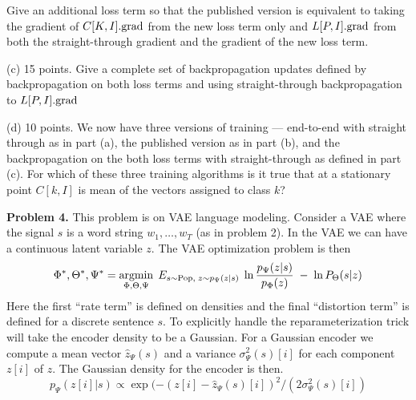 \documentclass{article}
\newcommand{\solution}[1]{}
\begin{document}
Give an additional loss term so that the published version is equivalent to taking the gradient of $C[K,I].\mathrm{grad}$ from the new loss term only
and $L[P,I].\mathrm{grad}$ from both the straight-through gradient and the gradient of the new loss term.

\solution{
  The additional loss is
  $$\frac{1}{2}\beta||L[P,I] - \hat{L}[P,I]||^2 = \sum_p \frac{1}{2}\beta||L[p,I] - C[k[p],I]||^2$$
}

(c) 15 points. Give a complete set of backpropagation updates defined by backpropagation on both loss terms and using straight-through
backpropagation to $L[P,I].\mathrm{grad}$

\solution{
\begin{eqnarray*}
  L.\grad & \pluseq & \hat{L}.\grad \\
  \mathrm{for}\;p\;\;\;C[k[p],I].\grad & \pluseq & \hat{L}[p,I].\grad \\
L.\grad & \pluseq & \beta(L - \hat{L}) \\
\mathrm{for}\;p\;\;C[k(t),I].\grad & \pluseq & \beta(C[k(t),I] - L[p,I])
\end{eqnarray*}

Here any hyper-parameter for the learning rate for $C[K,I]$ must be handled elsewhere (in the optimizer).
}

(d) 10 points. We now have three versions of training --- end-to-end with straight through as in part (a), the published version as in part (b),
and the backpropagation on the both loss terms with straight-through as defined in part (c). For which of these three training algorithms is it true that at a stationary point
$C[k,I]$ is mean of the vectors assigned to class $k$?

\solution{Of the three, this is only true for the published version.}

\bigskip
{\bf Problem 4.} This problem is on VAE language modeling.  Consider a VAE where the signal $s$ is a word string $w_1,\ldots,w_T$ (as in problem 2).  In the VAE 
we can have a continuous latent variable $z$. The VAE optimization problem is then
\begin{equation}
    \Phi^*,\Theta^*,\Psi^* = \operatorname*{argmin}_{\Phi,\Theta,\Psi}\;E_{s \sim \mathrm{Pop},\;z \sim p_\Psi(z|s)}\;\ln\frac{p_\Psi(z|s)}{p_\Phi(z)} \;-\; \ln P_\Theta(s|z)
    \label{VAE}
\end{equation}
Here the first ``rate term'' is defined on densities and the final ``distortion term'' is defined for a discrete sentence $s$.
To explicitly handle the reparameterization trick will take the encoder density to be a Gaussian.
For a Gaussian encoder we compute a mean vector $\hat{z}_\Psi(s)$ and a variance $\sigma^2_\Psi(s)[i]$ for each component
$z[i]$ of $z$.  The Gaussian density for the encoder is then.
$$ p_\Psi(z[i]|s) \propto \exp(-(z[i]-\hat{z}_\Psi(s)[i])^2/(2\sigma^2_\Psi(s)[i])$$
\end{document}
